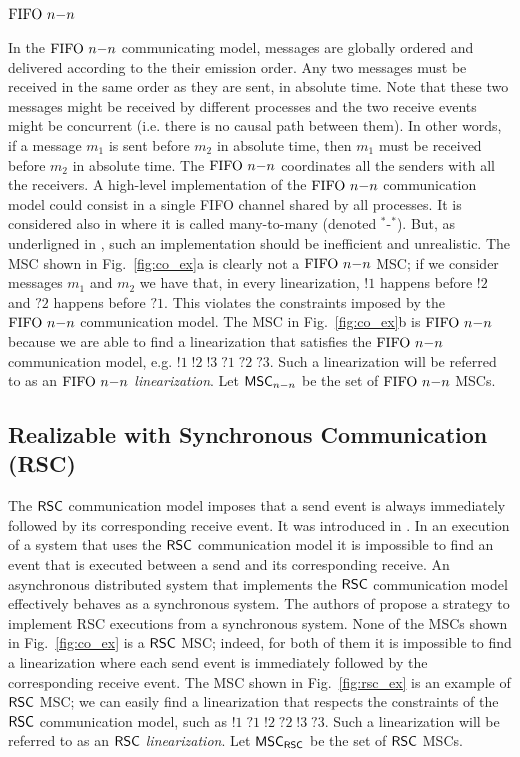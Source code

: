 \subsection{$\text{FIFO } n\mathsf{-}n$}
In the $\text{FIFO } n\mathsf{-}n$ communicating model, messages are globally ordered and delivered according to the their emission order. Any two messages must be received in the same order as they are sent, in absolute time. Note that these two messages might be received by different processes and the two receive events might be concurrent (i.e. there is no causal path between them). In other words, if a message $m_1$ is sent before $m_2$ in absolute time, then $m_1$ must be received before $m_2$ in absolute time. The $\text{FIFO } n\mathsf{-}n$ coordinates all the senders with all the receivers. A high-level implementation of the $\text{FIFO } n\mathsf{-}n$ communication model could consist in a single FIFO channel shared by all processes. It is considered also in \cite{DBLP:journals/tcs/BasuB16} where it is called  many-to-many (denoted $^\ast$-$^\ast$). But, as underligned in \cite{DBLP:journals/fac/ChevrouHQ16}, such an implementation should be inefficient and unrealistic.  The MSC shown in Fig.~\ref{fig:co_ex}a is clearly not a $\text{FIFO } n\mathsf{-}n$ MSC; if we consider messages $m_1$ and $m_2$ we have that, in every linearization, $!1$ happens before $!2$ and $?2$ happens before $?1$. This violates the constraints imposed by the $\text{FIFO } n\mathsf{-}n$ communication model. The MSC in Fig.~\ref{fig:co_ex}b is $\text{FIFO } n\mathsf{-}n$ because we are able to find a linearization that satisfies the $\text{FIFO } n\mathsf{-}n$ communication model, e.g. $!1\;!2\;!3\;?1\;?2\;?3$. Such a linearization will be referred to as an \emph{$\text{FIFO } n\mathsf{-}n$ linearization}. Let $\mathsf{MSC}_{n\mathsf{-}n}$ be the set of $\text{FIFO } n\mathsf{-}n$ MSCs.

\subsection{Realizable with Synchronous Communication (RSC)}
The $\mathsf{RSC}$ communication model imposes that a send event is always immediately followed by its corresponding receive event. It was introduced in \cite{DBLP:journals/dc/Charron-BostMT96}. In an execution of a system that uses the $\mathsf{RSC}$ communication model it is impossible to find an event that is executed between a send and its corresponding receive. An asynchronous distributed system that implements the $\mathsf{RSC}$ communication model effectively behaves as a synchronous system. The authors of \cite{kshemkalyani2011distributed} propose a strategy to implement RSC executions from a synchronous system. None of the MSCs shown in Fig.~\ref{fig:co_ex} is a $\mathsf{RSC}$ MSC; indeed, for both of them it is impossible to find a linearization where each send event is immediately followed by the corresponding receive event. The MSC shown in Fig.~\ref{fig:rsc_ex} is an example of $\mathsf{RSC}$ MSC; we can easily find a linearization that respects the constraints of the $\mathsf{RSC}$ communication model, such as $!1\;?1\;!2\;?2\;!3\;?3$. Such a linearization will be referred to as an \emph{$\mathsf{RSC}$ linearization}. Let $\mathsf{MSC}_{\mathsf{RSC}}$ be the set of $\mathsf{RSC}$ MSCs.



